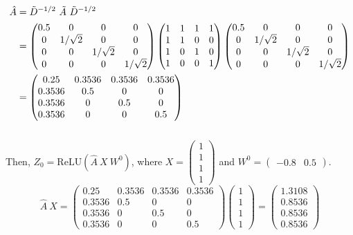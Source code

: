 \documentclass[a4paper]{article}
\begin{document}
\begin{align*}
    \hat{A} &= \Tilde{D}^{-1/2}\ \Tilde{A}\ \Tilde{D}^{-1/2}\\
    &= \begin{pmatrix}
0.5 & 0 & 0 & 0 \\
0 & 1/\sqrt{2} & 0 & 0 \\
0 & 0 & 1/\sqrt{2} & 0 \\
0 & 0 & 0 & 1/\sqrt{2}
\end{pmatrix} \begin{pmatrix}
1 & 1 & 1 & 1 \\
1 & 1 & 0 & 0 \\
1 & 0 & 1 & 0 \\
1 & 0 & 0 & 1
\end{pmatrix} \begin{pmatrix}
0.5 & 0 & 0 & 0 \\
0 & 1/\sqrt{2} & 0 & 0 \\
0 & 0 & 1/\sqrt{2} & 0 \\
0 & 0 & 0 & 1/\sqrt{2}
\end{pmatrix} \\
&= \begin{pmatrix}
0.25 & 0.3536 & 0.3536 & 0.3536 \\
0.3536 & 0.5 & 0 & 0 \\
0.3536 & 0 & 0.5 & 0 \\
0.3536 & 0 & 0 & 0.5
\end{pmatrix}
\end{align*}
\\
Then, $Z_0 = \text{ReLU} (\hat{A}\ X\ W^0)$, where $X = \begin{pmatrix}
    1\\1\\1\\1 \end{pmatrix}$ and $W^0 = \begin{pmatrix}
        -0.8 & 0.5
    \end{pmatrix}$.
\[
\hat{A}\ X = \begin{pmatrix}
0.25 & 0.3536 & 0.3536 & 0.3536 \\
0.3536 & 0.5 & 0 & 0 \\
0.3536 & 0 & 0.5 & 0 \\
0.3536 & 0 & 0 & 0.5
\end{pmatrix} \begin{pmatrix}
    1\\1\\1\\1 \end{pmatrix} = \begin{pmatrix}
    1.3108\\0.8536\\0.8536\\0.8536
\end{pmatrix}
\]
\end{document}
